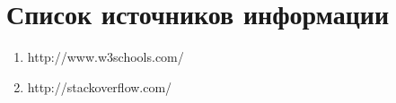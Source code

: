 \section{Список источников информации}

\begin{enumerate}

\item{http://www.w3schools.com/}

\item{http://stackoverflow.com/}

\end{enumerate}
